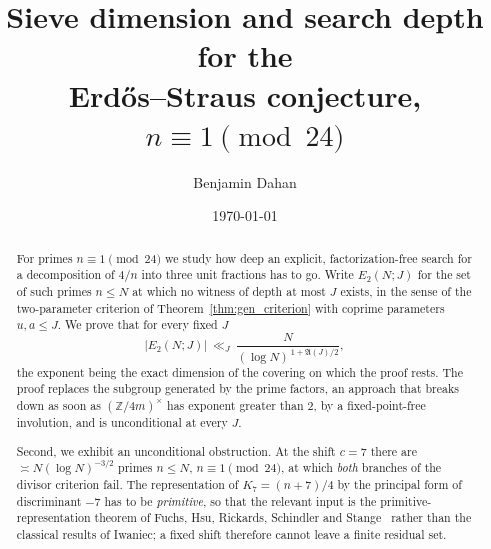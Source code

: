 \documentclass[11pt, a4paper]{article}
\theoremstyle{plain}
\theoremstyle{definition}
\newcommand{\Z}{\mathbb{Z}}
\begin{document}

\title{Sieve dimension and search depth for the\\ Erd\H{o}s--Straus conjecture, $n \equiv 1 \pmod{24}$}
\author{Benjamin Dahan}
\date{\today}

\maketitle

\begin{abstract}
For primes $n\equiv1\pmod{24}$ we study how deep an explicit, factorization-free search for a decomposition of $4/n$ into three unit fractions has to go. Write $E_2(N;J)$ for the set of such primes $n\le N$ at which no witness of depth at most $J$ exists, in the sense of the two-parameter criterion of Theorem~\ref{thm:gen_criterion} with coprime parameters $u,a\le J$. We prove that for every fixed $J$
$$|E_2(N;J)|\ \ll_J\ \frac{N}{(\log N)^{\,1+\mathfrak{A}(J)/2}},$$
the exponent being the exact dimension of the covering on which the proof rests. The proof replaces the subgroup generated by the prime factors, an approach that breaks down as soon as $(\Z/4m)^{\times}$ has exponent greater than $2$, by a fixed-point-free involution, and is unconditional at every $J$.

Second, we exhibit an unconditional obstruction. At the shift $c=7$ there are $\asymp N(\log N)^{-3/2}$ primes $n\le N$, $n\equiv1\pmod{24}$, at which \emph{both} branches of the divisor criterion fail. The representation of $K_7=(n+7)/4$ by the principal form of discriminant $-7$ has to be \emph{primitive}, so that the relevant input is the primitive-representation theorem of Fuchs, Hsu, Rickards, Schindler and Stange~\cite{fuchs2025} rather than the classical results of Iwaniec; a fixed shift therefore cannot leave a finite residual set.


\end{abstract}
\end{document}
